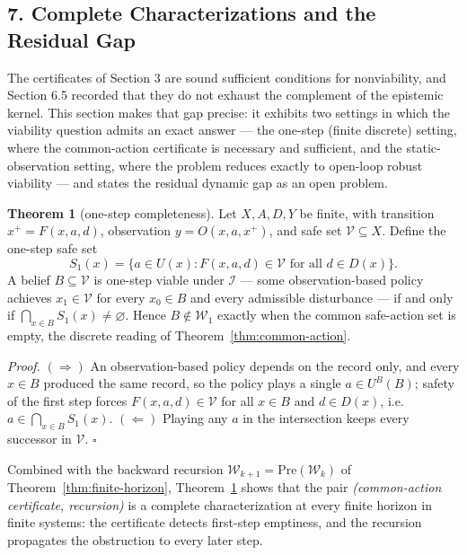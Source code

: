 \documentclass[10pt,twocolumn]{article}
\theoremstyle{definition}
\newtheorem{theorem}{Theorem}
\begin{document}
\subsection{7. Complete Characterizations and the Residual Gap}\label{complete-characterizations}

The certificates of Section 3 are sound sufficient conditions for nonviability, and Section 6.5 recorded that they do not exhaust the complement of the epistemic kernel. This section makes that gap precise: it exhibits two settings in which the viability question admits an exact answer --- the one-step (finite discrete) setting, where the common-action certificate is necessary and sufficient, and the static-observation setting, where the problem reduces exactly to open-loop robust viability --- and states the residual dynamic gap as an open problem.

\begin{theorem}[one-step completeness]\label{thm:onestep}
Let \(X, A, D, Y\) be finite, with transition \(x^{+} = F(x,a,d)\), observation \(y = O(x,a,x^{+})\), and safe set \(\mathcal{V} \subseteq X\). Define the one-step safe set
\[
S_{1}(x) = \bigl\{ a \in U(x) : F(x,a,d) \in \mathcal{V} \text{ for all } d \in D(x) \bigr\}.
\]
A belief \(B \subseteq \mathcal{V}\) is one-step viable under \(\mathcal{I}\) --- some observation-based policy achieves \(x_{1} \in \mathcal{V}\) for every \(x_{0} \in B\) and every admissible disturbance --- if and only if \(\bigcap_{x \in B} S_{1}(x) \neq \varnothing\). Hence \(B \notin \mathcal{W}_{1}\) exactly when the common safe-action set is empty, the discrete reading of Theorem~\ref{thm:common-action}.
\end{theorem}

\emph{Proof.} \((\Rightarrow)\) An observation-based policy depends on the record only, and every \(x \in B\) produced the same record, so the policy plays a single \(a \in U^{B}(B)\); safety of the first step forces \(F(x,a,d) \in \mathcal{V}\) for all \(x \in B\) and \(d \in D(x)\), i.e.\ \(a \in \bigcap_{x \in B} S_{1}(x)\). \((\Leftarrow)\) Playing any \(a\) in the intersection keeps every successor in \(\mathcal{V}\). \hfill\(\square\)

Combined with the backward recursion \(\mathcal{W}_{k+1} = \mathrm{Pre}(\mathcal{W}_{k})\) of Theorem~\ref{thm:finite-horizon}, Theorem~\ref{thm:onestep} shows that the pair \emph{(common-action certificate, recursion)} is a complete characterization at every finite horizon in finite systems: the certificate detects first-step emptiness, and the recursion propagates the obstruction to every later step.
\end{document}
